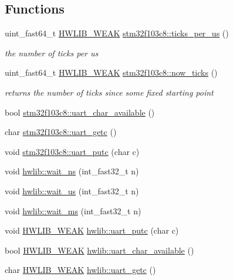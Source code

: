 \subsection*{Functions}
\begin{DoxyCompactItemize}
\item 
uint\+\_\+fast64\+\_\+t \hyperlink{hwlib-defines_8hpp_a04be4340016df60d6636c1d1c6d94fc9}{H\+W\+L\+I\+B\+\_\+\+W\+E\+AK} \hyperlink{namespacestm32f103c8_a7690d875e87715532777680634201060}{stm32f103c8\+::ticks\+\_\+per\+\_\+us} ()
\begin{DoxyCompactList}\small\item\em the number of ticks per us \end{DoxyCompactList}\item 
uint\+\_\+fast64\+\_\+t \hyperlink{hwlib-defines_8hpp_a04be4340016df60d6636c1d1c6d94fc9}{H\+W\+L\+I\+B\+\_\+\+W\+E\+AK} \hyperlink{namespacestm32f103c8_a3cee8ad2019972eede2f90456d5eb9e0}{stm32f103c8\+::now\+\_\+ticks} ()
\begin{DoxyCompactList}\small\item\em returns the number of ticks since some fixed starting point \end{DoxyCompactList}\item 
bool \hyperlink{namespacestm32f103c8_ab6a4d37dccd20d9ddd6ef943fffeb114}{stm32f103c8\+::uart\+\_\+char\+\_\+available} ()
\item 
char \hyperlink{namespacestm32f103c8_ad5b6e620a169eb8f233dc3f158e15ac7}{stm32f103c8\+::uart\+\_\+getc} ()
\item 
void \hyperlink{namespacestm32f103c8_a3b4365830ed2e5f66b80cac899ed29d4}{stm32f103c8\+::uart\+\_\+putc} (char c)
\item 
void \hyperlink{namespacehwlib_a9c01a1d0319f5eadd8926e66aea19aa0}{hwlib\+::wait\+\_\+ns} (int\+\_\+fast32\+\_\+t n)
\item 
void \hyperlink{namespacehwlib_a0096b739fc566c896366ecbd3113cc1e}{hwlib\+::wait\+\_\+us} (int\+\_\+fast32\+\_\+t n)
\item 
void \hyperlink{namespacehwlib_a6119aa5d3034176aa1515ef4bb193044}{hwlib\+::wait\+\_\+ms} (int\+\_\+fast32\+\_\+t n)
\item 
void \hyperlink{hwlib-defines_8hpp_a04be4340016df60d6636c1d1c6d94fc9}{H\+W\+L\+I\+B\+\_\+\+W\+E\+AK} \hyperlink{namespacehwlib_ae568ebef4b8d8a77cecae8cea595896f}{hwlib\+::uart\+\_\+putc} (char c)
\item 
bool \hyperlink{hwlib-defines_8hpp_a04be4340016df60d6636c1d1c6d94fc9}{H\+W\+L\+I\+B\+\_\+\+W\+E\+AK} \hyperlink{namespacehwlib_aaf31868f62815d2e405ad90469ae50a5}{hwlib\+::uart\+\_\+char\+\_\+available} ()
\item 
char \hyperlink{hwlib-defines_8hpp_a04be4340016df60d6636c1d1c6d94fc9}{H\+W\+L\+I\+B\+\_\+\+W\+E\+AK} \hyperlink{namespacehwlib_aa5ee60a7ff11cc49aba41f8be7f08a67}{hwlib\+::uart\+\_\+getc} ()
\end{DoxyCompactItemize}
